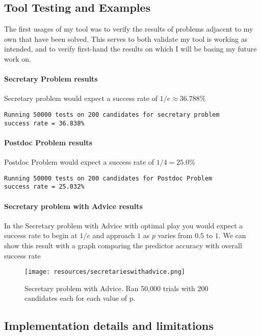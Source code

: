 \documentclass[a4paper,11pt]{article}
\begin{document}
\subsection{Tool Testing and Examples}
\label{sec:testingandexamples}

The first usages of my tool was to verify the results of problems adjacent to my own that have been solved. This serves to both validate my tool is working as intended, and to verify first-hand the results on which I will be basing my future work on.
\paragraph{Secretary Problem results}
Secretary problem would expect a success rate of $1/e \approx36.788\%$
\begin{verbatim}
Running 50000 tests on 200 candidates for secretary problem
success rate = 36.838%
\end{verbatim}

\paragraph{Postdoc Problem results}
Postdoc Problem would expect a success rate of $1/4 = 25.0\%$
\begin{verbatim}
Running 50000 tests on 200 candidates for Postdoc Problem
success rate = 25.032%
\end{verbatim}

\paragraph{Secretary problem with Advice results}
In the Secretary problem with Advice with optimal play you would expect a success rate to begin at $1/e$ and approach $1$ as $p$ varies from $0.5\text{ to }1$. We can show this result with a graph comparing the predictor accuracy with overall success rate

\begin{figure}[H]
    \centering
    \texttt{[image: resources/secretarieswithadvice.png]}
    \caption{Secretary problem with Advice. Ran 50,000 trials with 200 candidates each for each value of p.}
    \label{fig:ProblemWithAdvice}
\end{figure}

\subsection{Implementation details and limitations}
\end{document}
